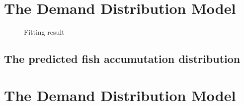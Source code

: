 \documentclass{mcmthesis}
\begin{document}
\begin{figure}[htbp]
{\begin{minipage}[t]{0.5\linewidth}
  \end{minipage}%
  }%
  \centering
\end{figure}



\section{The Demand Distribution Model}

\begin{figure}[tbp]
\caption{Fitting result}\label{figure1}
\end{figure}


 \subsection{The predicted fish accumutation distribution}


\section{The Demand Distribution Model}
\end{document}
